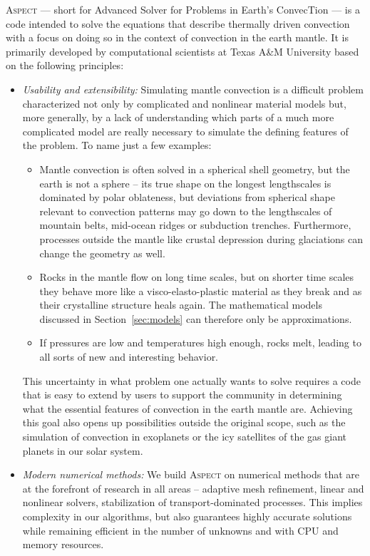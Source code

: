 \documentclass{article}
\newcommand{\aspect}{\textsc{Aspect}}
\begin{document}
\aspect{} --- short for Advanced Solver for Problems in Earth's ConvecTion ---
is a code intended to solve the equations that describe thermally driven
convection with a focus on doing so in the context of convection in the earth
mantle. It is primarily developed by computational scientists at Texas A\&M
University based on the following principles:
\begin{itemize}
\item \textit{Usability and extensibility:} Simulating mantle convection is a
  difficult problem characterized not only by complicated and nonlinear
  material models but, more generally, by a lack of understanding which parts
  of a much more complicated model are really necessary to simulate the
  defining features of the problem. To name just a few examples:
  \begin{itemize}
  \item Mantle convection is often solved in a spherical shell geometry, but
    the earth is not a sphere -- its true shape on the longest lengthscales is
    dominated by polar oblateness, but deviations from spherical shape
    relevant to convection patterns may go down to the lengthscales of
    mountain belts, mid-ocean ridges or subduction trenches. Furthermore,
    processes outside the mantle like crustal depression during glaciations
    can change the geometry as well.
  \item Rocks in the mantle flow on long time scales, but on shorter time
    scales they behave more like a visco-elasto-plastic material as they break
    and as their crystalline structure heals again. The mathematical models
    discussed in Section~\ref{sec:models} can therefore only be
    approximations.
    \item If pressures are low and temperatures high enough, rocks melt,
      leading to all sorts of new and interesting behavior.
  \end{itemize}
  This uncertainty in what problem one actually wants to solve requires a code
  that is easy to extend by users to support the community in determining what
  the essential features of convection in the earth mantle are. Achieving this
  goal also opens up possibilities outside the original scope, such as the
  simulation of convection in exoplanets or the icy satellites of the gas
  giant planets in our solar system.

\item \textit{Modern numerical methods:} We build \aspect{} on numerical
  methods that are at the forefront of research in all areas -- adaptive mesh
  refinement, linear and nonlinear solvers, stabilization of
  transport-dominated processes. This implies complexity in our algorithms,
  but also guarantees highly accurate solutions while remaining efficient in
  the number of unknowns and with CPU and memory resources.


\end{itemize}
\end{document}
